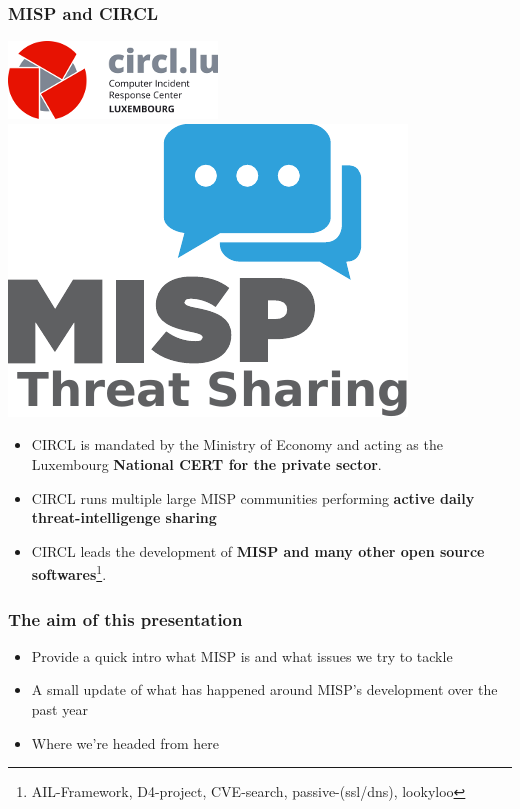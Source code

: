 
\begin{frame}
\titlepage
\end{frame}

\begin{frame}
  \frametitle{MISP and CIRCL}
  \begin{center}
    \includegraphics[scale=0.45]{circl.png}
    \hspace{2.5em}
    \includegraphics[scale=0.35]{misp.pdf}
  \end{center}
  \begin{itemize}
    \item CIRCL is mandated by the Ministry of Economy and acting as the Luxembourg {\bf National CERT for the private sector}. 
    \item CIRCL runs multiple large MISP communities performing {\bf active daily threat-intelligenge sharing}
    \item CIRCL leads the development of {\bf MISP and many other open source softwares}\footnote{AIL-Framework, D4-project, CVE-search, passive-(ssl/dns), lookyloo}.
  \end{itemize}
\end{frame}


\begin{frame}
  \frametitle{The aim of this presentation}
  \begin{itemize}
     \item Provide a quick intro what MISP is and what issues we try to tackle
     \item A small update of what has happened around MISP's development over the past year
     \item Where we're headed from here
  \end{itemize}
\end{frame}

